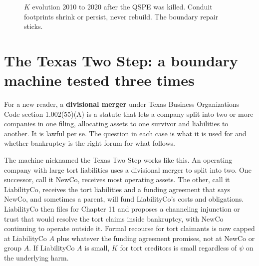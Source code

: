 \begin{figure}[h]
\centering
{}
\caption{$K$ evolution 2010 to 2020 after the QSPE was killed. Conduit footprints shrink or persist, never rebuild. The boundary repair sticks.}
\label{fig:entity-ktimeline}
\end{figure}

\section{The Texas Two Step: a boundary machine tested three times}

For a new reader, a \textbf{divisional merger} under Texas Business Organizations Code section 1.002(55)(A) is a statute that lets a company split into two or more companies in one filing, allocating assets to one survivor and liabilities to another. It is lawful per se. The question in each case is what it is used for and whether bankruptcy is the right forum for what follows.

The machine nicknamed the Texas Two Step works like this. An operating company with large tort liabilities uses a divisional merger to split into two. One successor, call it NewCo, receives most operating assets. The other, call it LiabilityCo, receives the tort liabilities and a funding agreement that says NewCo, and sometimes a parent, will fund LiabilityCo's costs and obligations. LiabilityCo then files for Chapter 11 and proposes a channeling injunction or trust that would resolve the tort claims inside bankruptcy, with NewCo continuing to operate outside it. Formal recourse for tort claimants is now capped at LiabilityCo $A$ plus whatever the funding agreement promises, not at NewCo or group $A$. If LiabilityCo $A$ is small, $K$ for tort creditors is small regardless of $\psi$ on the underlying harm.

